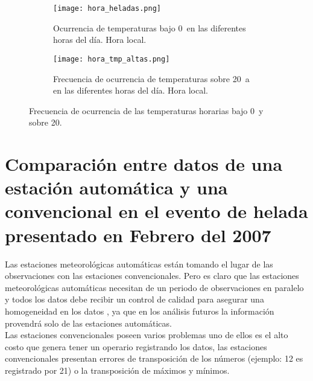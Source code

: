 \begin{figure}[H]
	\begin{subfigure}[b]{\linewidth}
	\begin{center}
	\texttt{[image: hora\_heladas.png]}
		
		\caption{Ocurrencia de temperaturas bajo 0\celc \  en las diferentes horas del día. Hora local.}		
		\label{graph:tmp_bajo_hora}
		
	\end{center}
	\end{subfigure}
	
	\begin{subfigure}[b]{\linewidth}
	\begin{center}
	\texttt{[image: hora\_tmp\_altas.png]}
		
		\caption{Frecuencia de ocurrencia de temperaturas sobre 20\celc \  a en las diferentes horas del día. Hora local.}		
		\label{graph:tmp_sobre_hora}
		
	\end{center}
	\end{subfigure}
	
	
	\caption{Frecuencia de ocurrencia de las temperaturas horarias bajo 0\celc \  y sobre 20\celc.}		
	\label{graph:tmp_hora}

\end{figure}


\section{Comparación entre datos de una estación automática y una convencional en el evento de helada presentado en Febrero del 2007}


Las estaciones meteorológicas automáticas están tomando el lugar de las observaciones con las estaciones convencionales. Pero es claro que las estaciones meteorológicas automáticas necesitan de un periodo de observaciones en paralelo y todos los datos debe recibir un control de calidad para asegurar una homogeneidad en los datos \citep{Ying2004}, ya que en los análisis futuros la información provendrá solo de las estaciones automáticas.\\

Las estaciones convencionales poseen varios problemas uno de ellos es el alto costo que genera tener un operario registrando los datos, las estaciones convencionales presentan errores de transposición de los números (ejemplo: 12 es registrado por 21) o la transposición de máximos y mínimos.\\

